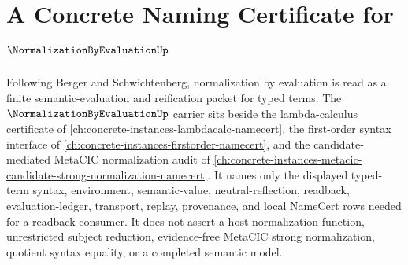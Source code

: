 \chapter{A Concrete Naming Certificate for $\NormalizationByEvaluationUp$}
\label{ch:concrete-instances-normalization-by-evaluation-namecert}

Following Berger and Schwichtenberg, normalization by evaluation is read as a finite semantic-evaluation and reification packet for typed terms. The $\NormalizationByEvaluationUp$ carrier sits beside the lambda-calculus certificate of \autoref{ch:concrete-instances-lambdacalc-namecert}, the first-order syntax interface of \autoref{ch:concrete-instances-firstorder-namecert}, and the candidate-mediated MetaCIC normalization audit of \autoref{ch:concrete-instances-metacic-candidate-strong-normalization-namecert}. It names only the displayed typed-term syntax, environment, semantic-value, neutral-reflection, readback, evaluation-ledger, transport, replay, provenance, and local NameCert rows needed for a readback consumer. It does not assert a host normalization function, unrestricted subject reduction, evidence-free MetaCIC strong normalization, quotient syntax equality, or a completed semantic model.

